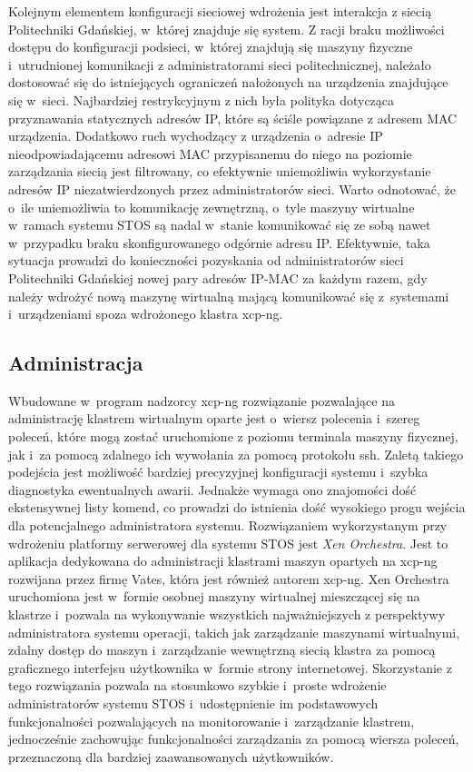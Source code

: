 \noindent Kolejnym elementem konfiguracji sieciowej wdrożenia jest interakcja z siecią Politechniki Gdańskiej, w~której znajduje się system. Z racji braku możliwości dostępu do konfiguracji podsieci, w~której znajdują się maszyny fizyczne i~utrudnionej komunikacji z administratorami sieci politechnicznej, należało dostosować się do istniejących ograniczeń nałożonych na urządzenia znajdujące się w~sieci. Najbardziej restrykcyjnym z nich była polityka dotycząca przyznawania statycznych adresów IP, które są ściśle powiązane z adresem MAC urządzenia. Dodatkowo ruch wychodzący z urządzenia o~adresie IP nieodpowiadającemu adresowi MAC przypisanemu do niego na poziomie zarządzania siecią jest filtrowany, co efektywnie uniemożliwia wykorzystanie adresów IP niezatwierdzonych przez administratorów sieci. Warto odnotować, że o~ile uniemożliwia to komunikację zewnętrzną, o~tyle maszyny wirtualne w~ramach systemu STOS są nadal w~stanie komunikować się ze sobą nawet w~przypadku braku skonfigurowanego odgórnie adresu IP. Efektywnie, taka sytuacja prowadzi do konieczności pozyskania od administratorów sieci Politechniki Gdańskiej nowej pary adresów IP-MAC za każdym razem, gdy należy wdrożyć nową maszynę wirtualną mającą komunikować się z~systemami i~urządzeniami spoza wdrożonego klastra xcp-ng.
\subsection{Administracja}
Wbudowane w~program nadzorcy xcp-ng rozwiązanie pozwalające na administrację klastrem wirtualnym oparte jest o~wiersz polecenia i~szereg poleceń, które mogą zostać uruchomione z poziomu terminala maszyny fizycznej, jak i~za pomocą zdalnego ich wywołania za pomocą protokołu ssh. Zaletą takiego podejścia jest możliwość bardziej precyzyjnej konfiguracji systemu i~szybka diagnostyka ewentualnych awarii. Jednakże wymaga ono znajomości dość ekstensywnej listy komend, co prowadzi do istnienia dość wysokiego progu wejścia dla potencjalnego administratora systemu. 
\noindent Rozwiązaniem wykorzystanym przy wdrożeniu platformy serwerowej dla systemu STOS jest \textit{Xen Orchestra}. Jest to aplikacja dedykowana do administracji klastrami maszyn opartych na xcp-ng rozwijana przez firmę Vates, która jest również autorem xcp-ng. Xen Orchestra uruchomiona jest w~formie osobnej maszyny wirtualnej mieszczącej się na klastrze i~pozwala na wykonywanie wszystkich najważniejszych z perspektywy administratora systemu operacji, takich jak zarządzanie maszynami wirtualnymi, zdalny dostęp do maszyn i~zarządzanie wewnętrzną siecią klastra za pomocą graficznego interfejsu użytkownika w~formie strony internetowej\cite{xoa}. Skorzystanie z tego rozwiązania pozwala na stosunkowo szybkie i~proste wdrożenie administratorów systemu STOS i~udostępnienie im podstawowych funkcjonalności pozwalających na monitorowanie i~zarządzanie klastrem, jednocześnie zachowując funkcjonalności zarządzania za pomocą wiersza poleceń, przeznaczoną dla bardziej zaawansowanych użytkowników.
